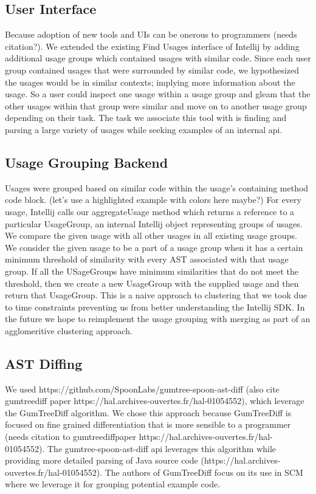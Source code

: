 \documentclass[conference]{IEEEtran}
\begin{document}
\subsection{User Interface} %
Because adoption of new tools and UIs can be onerous to programmers (needs citation?). We extended the existing Find Usages interface of Intellij by adding additional usage groups which contained usages with similar code. Since each user group contained usages that were surrounded by similar code, we hypothesized the usages would be in similar contexts; implying more information about the usage. So a user could inspect one usage within a usage group and gleam that the other usages within that group were similar and move on to another usage group depending on their task. The task we associate this tool with is finding and parsing a large variety of usages while seeking examples of an internal api.

\subsection{Usage Grouping Backend} 
Usages were grouped based on similar code within the usage's containing method code block. (let's use a highlighted example with colors here maybe?) For every usage, Intellij calls our aggregateUsage method which returns a reference to a particular UsageGroup, an internal Intellij object representing groups of usages. We compare the given usage with all other usages in all existing usage groups. We consider the given usage to be a part of a usage group when it has a certain minimum threshold of similarity with every AST associated with that usage group. If all the USageGroups have minimum similarities that do not meet the threshold, then we create a new UsageGroup with the supplied usage and then return that UsageGroup. This is a naive approach to clustering that we took due to time constraints preventing us from better understanding the Intellij SDK. In the future we hope to reimplement the usage grouping with merging as part of an agglomeritive clustering approach.

\subsection{AST Diffing}
We used https://github.com/SpoonLabs/gumtree-spoon-ast-diff (also cite gumtreediff paper https://hal.archives-ouvertes.fr/hal-01054552), which leverage the GumTreeDiff algorithm. We chose this approach because GumTreeDiff is focused on fine grained differentiation that is more sensible to a programmer (needs citation to gumtreediffpaper https://hal.archives-ouvertes.fr/hal-01054552). The gumtree-spoon-ast-diff api leverages this algorithm while providing more detailed parsing of Java source code (https://hal.archives-ouvertes.fr/hal-01054552). The authors of GumTreeDiff focus on its use in SCM where we leverage it for grouping potential example code.
\end{document}
